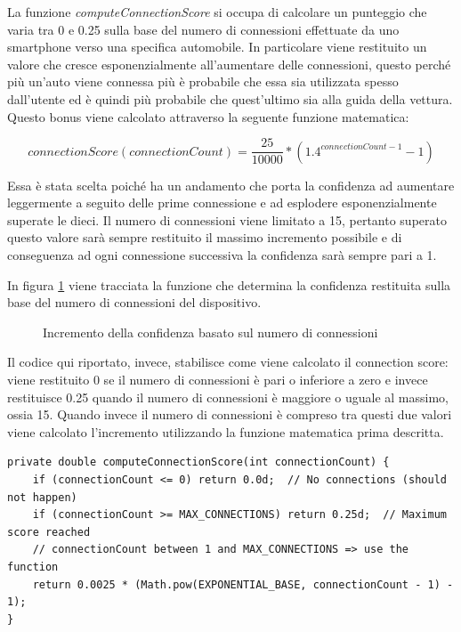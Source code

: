 La funzione \textit{computeConnectionScore} si occupa di calcolare un punteggio che varia tra 0 e 0.25 sulla base del numero di connessioni effettuate da uno smartphone verso una specifica automobile. In particolare viene restituito un valore che cresce esponenzialmente all'aumentare delle connessioni, questo perché più un'auto viene connessa più è probabile che essa sia utilizzata spesso dall'utente ed è quindi più probabile che quest'ultimo sia alla guida della vettura. Questo bonus viene calcolato attraverso la seguente funzione matematica:

\[connectionScore(connectionCount) = \frac{25}{10000} * (1.4^{connectionCount-1} - 1)\]

Essa è stata scelta poiché ha un andamento che porta la confidenza ad aumentare leggermente a seguito delle prime connessione e ad esplodere esponenzialmente superate le dieci. Il numero di connessioni viene limitato a 15, pertanto superato questo valore sarà sempre restituito il massimo incremento possibile e di conseguenza ad ogni connessione successiva la confidenza sarà sempre pari a 1. 

In figura \ref{fig:confidence-func} viene tracciata la funzione che determina la confidenza restituita sulla base del numero di connessioni del dispositivo. 

\begin{figure}[H]
    \centering
    \caption{Incremento della confidenza basato sul numero di connessioni}
    \label{fig:confidence-func}
\end{figure}

Il codice qui riportato, invece, stabilisce come viene calcolato il connection score: viene restituito 0 se il numero di connessioni è pari o inferiore a zero e invece restituisce 0.25 quando il numero di connessioni è maggiore o uguale al massimo, ossia 15. Quando invece il numero di connessioni è compreso tra questi due valori viene calcolato l'incremento utilizzando la funzione matematica prima descritta.
\begin{verbatim}
private double computeConnectionScore(int connectionCount) {
    if (connectionCount <= 0) return 0.0d;  // No connections (should not happen)
    if (connectionCount >= MAX_CONNECTIONS) return 0.25d;  // Maximum score reached
    // connectionCount between 1 and MAX_CONNECTIONS => use the function
    return 0.0025 * (Math.pow(EXPONENTIAL_BASE, connectionCount - 1) - 1);
}
\end{verbatim}

